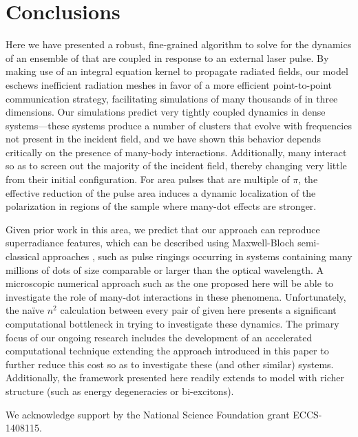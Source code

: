 \section{Conclusions}
Here we have presented a robust, fine-grained algorithm to solve for the dynamics of an ensemble of \qds{} that are coupled in response to an external laser pulse. 
By making use of an integral equation kernel to propagate radiated fields, our model eschews inefficient radiation meshes in favor of a more efficient point-to-point communication strategy, facilitating simulations of many thousands of \qds{} in three dimensions.
Our simulations predict very tightly coupled dynamics in dense \qd{} systems---these systems produce a number of clusters that evolve with frequencies not present in the incident field, and we have shown this behavior depends critically on the presence of many-body interactions.
Additionally, many \qds{} interact so as to screen out the majority of the incident field, thereby changing very little from their initial configuration. For area pulses that are multiple of $\pi$, the effective reduction of the pulse area induces a dynamic localization of the polarization in regions of the sample where many-dot effects are stronger. 

Given prior work in this area, we predict that our approach can reproduce superradiance features, which can be  described using Maxwell-Bloch semi-classical approaches \cite{haroche review}, such as pulse ringings \cite{Burnham-Chiao PR 188 667 1969,MacGillivray1976} occurring in systems containing many millions of dots of size comparable or larger than the optical wavelength. A  microscopic numerical approach such as the one proposed here will be able to investigate the role of many-dot interactions in these phenomena. Unfortunately, the na\"ive $n^2$ calculation between every pair of \qds{} given here presents a significant computational bottleneck in trying to investigate these dynamics. The primary focus of our ongoing research includes the development of an accelerated computational technique extending the approach introduced in this paper to further reduce this cost so as to investigate these (and other similar) systems. Additionally, the framework presented here readily extends to model \qds{} with richer structure (such as energy degeneracies or bi-excitons).

\acknowledgments  We acknowledge support by the National Science Foundation grant ECCS-1408115. 
